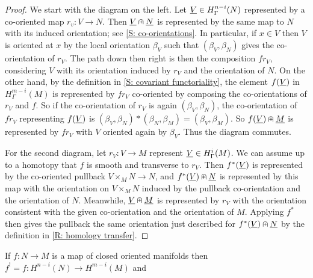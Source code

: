 \begin{proof}
	We start with the diagram on the left.
	Let $\underline{V} \in H^{n-i}_\Gamma(N)$ represented by a co-oriented map $r_v \colon V \to N$.
	Then $\underline{V}\nplus\underline{N}$ is represented by the same map to $N$ with its induced orientation; see \cref{S: co-orientations}.
	In particular, if $x \in V$ then $V$ is oriented at $x$ by the local orientation $\beta_V$ such that $(\beta_V,\beta_N)$ gives the co-orientation of $r_V$.
	The path down then right is then the composition $fr_V$, considering $V$ with its orientation induced by $r_V$ and the orientation of $N$.
	On the other hand, by the definition in \cref{S: covariant functoriality}, the element $f(\underline{V})$ in $H^{m-i}_\Gamma(M)$ is represented by $fr_V$ co-oriented by composing the co-orientations of $r_V$ and $f$.
	So if the co-orientation of $r_V$ is again $(\beta_V,\beta_N)$, the co-orientation of $fr_V$ representing $f(\underline{V})$ is $(\beta_V,\beta_N)*(\beta_N,\beta_M) = (\beta_V,\beta_M)$.
	So $f(\underline{V})\nplus \underline{M}$ is represented by $fr_V$ with $V$ oriented again by $\beta_V$.
	Thus the diagram commutes.

	For the second diagram, let $r_V \colon V \to M$ represent $\underline{V} \in H^{i}_\Gamma(M)$.
	We can assume up to a homotopy that $f$ is smooth and transverse to $r_V$.
	Then $f^*(\underline{V})$ is represented by the co-oriented pullback $V \times_M N \to N$, and $f^*(\underline{V})\nplus\underline{N}$ is represented by this map with the orientation on $V \times_M N$ induced by the pullback co-orientation and the orientation of $N$.
	Meanwhile, $\underline{V}\nplus \underline{M}$ is represented by $r_V$ with the orientation consistent with the given co-orientation and the orientation of $M$.
	Applying $f^*$ then gives the pullback the same orientation just described for $f^*(\underline{V})\nplus\underline{N}$ by the definition in \cref{R: homology transfer}.
\end{proof}

\begin{corollary}
	If $f \colon N \to M$ is a map of closed oriented manifolds then
	$f^! = f \colon H^{n-i}(N) \to H^{m-i}(M)$ and
\end{corollary}

